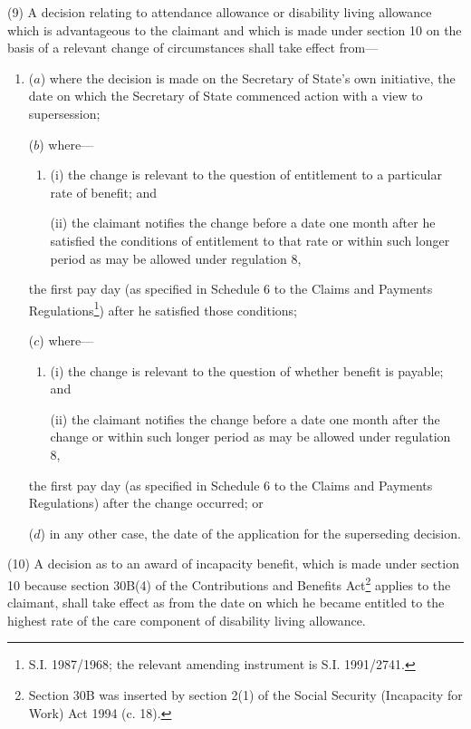 \documentclass[12pt,a4paper]{article}
\begin{document}
(9) A decision relating to attendance allowance or disability living allowance which is advantageous to the claimant and which is made under section 10 on the basis of a relevant change of circumstances shall take effect from—
\begin{enumerate}\item[]
($a$) where the decision is made on the Secretary of State’s own initiative, 
the date on which the Secretary of State commenced action with a view to supersession;  %

($b$) where—
\begin{enumerate}\item[]
(i) the change is relevant to the question of entitlement to a particular rate of benefit; and

(ii) the claimant notifies the change before a date one month after he satisfied the conditions of entitlement to that rate or within such longer period as may be allowed under regulation 8,
\end{enumerate}
the first pay day (as specified in Schedule 6 to the Claims and Payments Regulations\footnote{\frenchspacing S.I. 1987/1968; the relevant amending instrument is S.I. 1991/2741.}) after he satisfied those conditions;

($c$) where—
\begin{enumerate}\item[]
(i) the change is relevant to the question of whether benefit is payable; and

(ii) the claimant notifies the change before a date one month after the change or within such longer period as may be allowed under regulation 8,
\end{enumerate}
the first pay day (as specified in Schedule 6 to the Claims and Payments Regulations) after the change occurred; or

($d$) in any other case, the date of the application for the superseding decision.
\end{enumerate}

(10) A decision as to an award of incapacity benefit, which is made under section 10 because section 30B(4) of the Contributions and Benefits Act\footnote{\frenchspacing Section 30B was inserted by section 2(1) of the Social Security (Incapacity for Work) Act 1994 (c. 18).} applies to the claimant, shall take effect as from the date on which he became entitled to the highest rate of the care component of disability living allowance.
\end{document}
